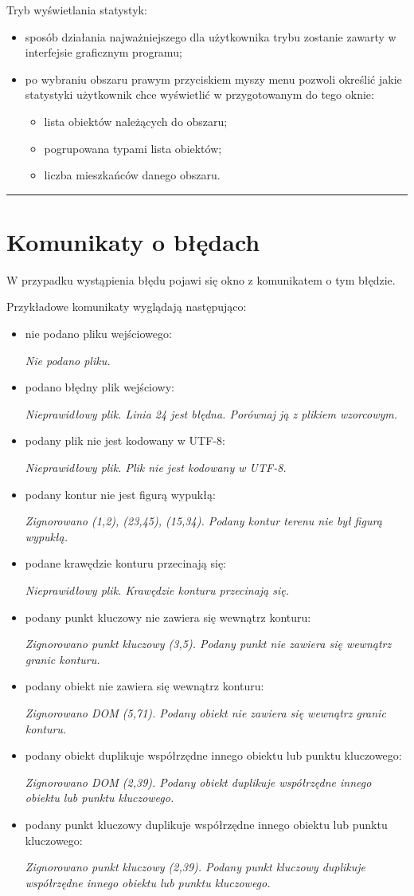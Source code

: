 \documentclass[a4paper,11pt]{article}
\newcommand{\linia}{\rule{\linewidth}{0.4mm}}
\begin{document}
Tryb wyświetlania statystyk:
\begin{itemize}
\item sposób działania najważniejszego dla użytkownika trybu zostanie zawarty w interfejsie graficznym programu;
\item po wybraniu obszaru prawym przyciskiem myszy menu pozwoli określić jakie statystyki użytkownik chce wyświetlić w przygotowanym do tego oknie:
\begin{itemize}
\item lista obiektów należących do obszaru;
\item pogrupowana typami lista obiektów;
\item liczba mieszkańców danego obszaru.
\end{itemize}
\end{itemize}
\noindent\linia
\section{Komunikaty o błędach}
W przypadku wystąpienia błędu pojawi się okno z komunikatem o tym błędzie.

\noindent
Przykładowe komunikaty wyglądają następująco:
\begin{itemize}
\item nie podano pliku wejściowego:

\textit{Nie podano pliku.}
\item podano błędny plik wejściowy:

\textit{Nieprawidłowy plik. Linia 24 jest błędna. Porównaj ją z plikiem wzorcowym.}
\item podany plik nie jest kodowany w UTF-8:

\textit{Nieprawidłowy plik. Plik nie jest kodowany w UTF-8.}
\item podany kontur nie jest figurą wypukłą:

\textit{Zignorowano (1,2), (23,45), (15,34). Podany kontur terenu nie był figurą wypukłą.}
\item podane krawędzie konturu przecinają się:

\textit{Nieprawidłowy plik. Krawędzie konturu przecinają się.}
\item podany punkt kluczowy nie zawiera się wewnątrz konturu:

\textit{Zignorowano punkt kluczowy (3,5). Podany punkt nie zawiera się wewnątrz granic konturu.}
\item podany obiekt nie zawiera się wewnątrz konturu:

\textit{Zignorowano DOM (5,71). Podany obiekt nie zawiera się wewnątrz granic konturu.}
\item podany obiekt duplikuje współrzędne innego obiektu lub punktu kluczowego:

\textit{Zignorowano DOM (2,39). Podany obiekt duplikuje współrzędne innego obiektu lub punktu kluczowego.}
\item podany punkt kluczowy duplikuje współrzędne innego obiektu lub punktu kluczowego:

\textit{Zignorowano punkt kluczowy (2,39).  Podany punkt kluczowy duplikuje współrzędne innego obiektu lub punktu kluczowego.}

\end{itemize}
\end{document}
